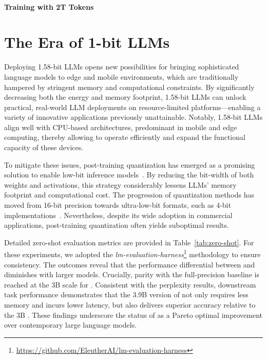 \paragraph{Training with 2T Tokens}

\section{The Era of 1-bit LLMs}

Deploying 1.58-bit LLMs opens new possibilities for bringing sophisticated language models to edge and mobile environments, which are traditionally hampered by stringent memory and computational constraints. By significantly decreasing both the energy and memory footprint, 1.58-bit LLMs can unlock practical, real-world LLM deployments on resource-limited platforms—enabling a variety of innovative applications previously unattainable. Notably, 1.58-bit LLMs align well with CPU-based architectures, predominant in mobile and edge computing, thereby allowing  to operate efficiently and expand the functional capacity of these devices.

To mitigate these issues, post-training quantization has emerged as a promising solution to enable low-bit inference models~\cite{smoothquant, gptq, quip, quip_sharp}. By reducing the bit-width of both weights and activations, this strategy considerably lessens LLMs’ memory footprint and computational cost. The progression of quantization methods has moved from 16-bit precision towards ultra-low-bit formats, such as 4-bit implementations~\cite{gptq, awq}. Nevertheless, despite its wide adoption in commercial applications, post-training quantization often yields suboptimal results.

Detailed zero-shot evaluation metrics are provided in Table~\ref{tab:zero-shot}. For these experiments, we adopted the \emph{lm-evaluation-harness}\footnote{\url{https://github.com/EleutherAI/lm-evaluation-harness}} methodology to ensure consistency. The outcomes reveal that the performance differential between  and  diminishes with larger models. Crucially, parity with the full-precision baseline is reached at the 3B scale for . Consistent with the perplexity results, downstream task performance demonstrates that the 3.9B version of  not only requires less memory and incurs lower latency, but also delivers superior accuracy relative to the 3B . These findings underscore the status of  as a Pareto optimal improvement over contemporary large language models.

